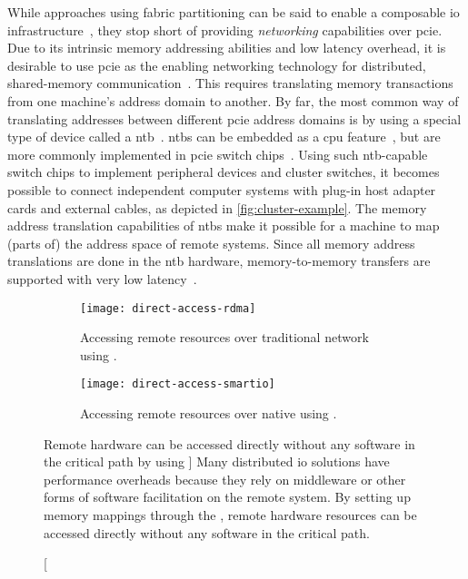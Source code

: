 While approaches using fabric partitioning can be said to enable a composable \gls{io} infrastructure~\cite{Chung2018}, they stop short of providing \emph{networking} capabilities over \gls{pcie}.
%
Due to its intrinsic memory addressing abilities and low latency overhead, it is desirable to use \gls{pcie} as the enabling networking technology for distributed, shared-memory communication~\cite{Shim2018,whitepaper:Regula2004,url:Meduri2011}.
%
This requires translating memory transactions from one machine's address domain to another.
%
By far, the most common way of translating addresses between different \gls{pcie} address domains is by using a special type of device called a \gls{ntb}~\cite{whitepaper:PLX,whitepaper:Regula2004,Hou2013,Tu2014}.
%
\Glspl{ntb} can be embedded as a \gls{cpu} feature~\cite{whitepaper:Sullivan2010,url:LinuxNTB-AMD}, but are more commonly implemented in \gls{pcie} switch chips~\cite{whitepaper:PLX,pex8733}.
%
Using such \gls{ntb}-capable switch chips to implement peripheral devices and cluster switches, it becomes possible to connect independent computer systems with plug-in host adapter cards and external cables, as depicted in \cref{fig:cluster-example}.
%
The memory address translation capabilities of \glspl{ntb} make it possible for a machine to map (parts of) the address space of remote systems.
%
Since all memory address translations are done in the \gls{ntb} hardware, memory-to-memory transfers are supported with very low latency~\cite{Lim2019,Tu2014}.



\begin{figure}
    \centering
    \begin{subfigure}{\linewidth}
        \centering
        \texttt{[image: direct-access-rdma]}
        \caption{Accessing remote resources over traditional network using .}
    \end{subfigure}
    \par\vspace{5mm}
    \begin{subfigure}{\linewidth}
        \centering
        \texttt{[image: direct-access-smartio]}
        \caption{Accessing remote resources over native  using .}
    \end{subfigure}
    \caption
    [Remote hardware can be accessed directly without any software in the critical path by using ]
    {Many distributed \gls{io} solutions have performance overheads because they rely on \gls{middleware} or other forms of software facilitation on the remote system. By setting up memory mappings through the , remote hardware resources can be accessed directly without any software in the critical path.}
    \label{fig:direct-access}
\end{figure}





